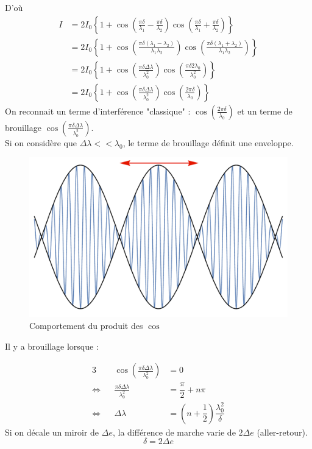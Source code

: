 \documentclass[12pt,a4paper]{article}
\begin{document}
	D'où
	\begin{align*}
	I &= 2I_0\left\lbrace 1+\cos \left(\frac{\pi  \delta }{\lambda _1}-\frac{\pi  \delta }{\lambda _2}\right) \cos \left(\frac{\pi  \delta }{\lambda _1}+\frac{\pi  \delta }{\lambda _2}\right)\right\rbrace \\
	&= 2I_0\left\lbrace 1+\cos \left(\frac{\pi  \delta  \left(\lambda _1-\lambda _2\right)}{\lambda _1 \lambda _2}\right) \cos \left(\frac{\pi  \delta  \left(\lambda _1+\lambda _2\right)}{\lambda _1 \lambda _2}\right)\right\rbrace\\
	&= 2I_0\left\lbrace 1+\cos \left(\frac{\pi  \delta  \Delta\lambda}{\lambda_{0}^2}\right) \cos \left(\frac{\pi  \delta  2 \lambda_0}{\lambda_{0}^2}\right)\right\rbrace\\
	&= 2I_0\left\lbrace 1+\cos \left(\frac{\pi  \delta  \Delta\lambda}{\lambda_{0}^2}\right) \cos \left(\frac{2 \pi  \delta  }{\lambda_{0}}\right)\right\rbrace
	\end{align*}
	On reconnait un terme d'interférence "classique" : $\cos \left(\frac{2 \pi  \delta  }{\lambda_{0}}\right)$ et un terme de brouillage $\cos \left(\frac{\pi  \delta  \Delta\lambda}{\lambda_{0}^2}\right)$.\\
	Si on considère que $\Delta\lambda<<\lambda_{0}$, le terme de brouillage définit une enveloppe.
	\begin{figure}[h]
		\centering
		\includegraphics[width=0.5\linewidth]{Brouillage}
		\caption{Comportement du produit des $\cos$}
	\end{figure}
	
	
	Il y a brouillage lorsque :
	
	\begin{alignat*}{3}
	&&\cos \left(\frac{\pi  \delta  \Delta\lambda}{\lambda_{0}^2}\right) & = 0\\
	\iff&& \frac{\pi  \delta  \Delta\lambda}{\lambda_{0}^2} & = \dfrac{\pi}{2} + n\pi\\
	\iff&& \Delta\lambda & = (n+\dfrac{1}{2}) \dfrac{\lambda_{0}^{2}}{\delta}
	\end{alignat*}
	Si on décale un miroir de $\Delta e$, la différence de marche varie de $2\Delta e$ (aller-retour).
	$$\delta = 2\Delta e$$
	
\end{document}
